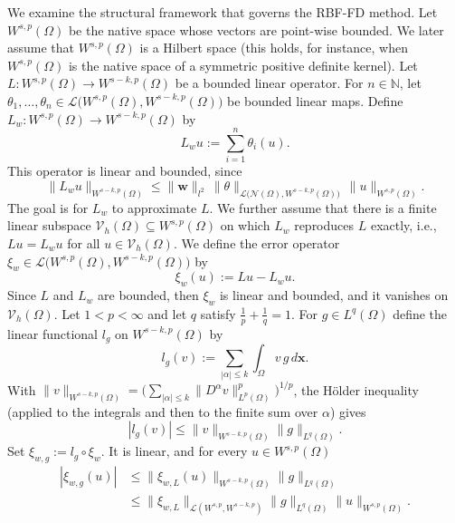 \documentclass[11pt]{article}
\begin{document}
We examine the structural framework that governs the RBF-FD method. Let $W^{s,p}(\Omega)$ be the native space whose vectors are point-wise bounded. We later assume that $W^{s,p}(\Omega)$ is a Hilbert space (this holds, for instance, when $W^{s,p}(\Omega)$ is the native space of a symmetric positive definite kernel). Let $L:W^{s,p}(\Omega) \rightarrow W^{s-k,p}(\Omega)$ be a bounded linear operator. For $n \in \mathbb{N}$, let $\theta_1, \dots, \theta_n \in \mathcal{L}\bigl(W^{s,p}(\Omega), W^{s-k,p}(\Omega)\bigr)$ be bounded linear maps. Define $L_w:W^{s,p}(\Omega) \rightarrow W^{s-k,p}(\Omega)$ by
\begin{equation}
	L_w u := \sum_{i=1}^n \theta_i(u).
\end{equation}
This operator is linear and bounded, since
\begin{equation*}
	\| L_w u \|_{W^{s-k,p}(\Omega)} \le \| \bm{w} \|_{l^2} \, \| \theta \|_{\mathcal{L}\bigl(\mathcal{N}(\Omega), W^{s-k,p}(\Omega)\bigr)} \, \| u \|_{W^{s,p}(\Omega)}.
\end{equation*}
The goal is for $L_w$ to approximate $L$. We further assume that there is a finite linear subspace $\mathcal{V}_h(\Omega) \subseteq W^{s,p}(\Omega)$ on which $L_w$ reproduces $L$ exactly, i.e., $Lu = L_w u$ for all $u \in \mathcal{V}_h(\Omega)$. We define the error operator $\xi_{w} \in \mathcal{L}\bigl(W^{s,p}(\Omega), W^{s-k,p}(\Omega)\bigr)$ by
\begin{equation*}
	\xi_{w}(u) := Lu - L_w u .
\end{equation*}
Since $L$ and $L_w$ are bounded, then $\xi_w$ is linear and bounded, and it vanishes on $\mathcal{V}_h(\Omega)$. Let $1 < p < \infty$ and let $q$ satisfy $\frac{1}{p} + \frac{1}{q} = 1$. For $g \in L^{q}(\Omega)$ define the linear functional $l_g$ on $W^{s-k,p}(\Omega)$ by
\begin{equation*}
	l_g(v) := \sum_{|\alpha| \le k} \int_\Omega v \, g \, d\bm{x}.
\end{equation*}
With $\| v \|_{W^{s-k,p}(\Omega)} = \bigl( \sum_{|\alpha| \le k} \| D^\alpha v \|_{L^p(\Omega)}^p \bigr)^{1/p}$, the H\"{o}lder inequality (applied to the integrals and then to the finite sum over $\alpha$) gives
\begin{equation*}
	|l_g(v)| \le \| v \|_{W^{s-k,p}(\Omega)} \| g \|_{L^{q}(\Omega)}.
\end{equation*}
Set $\xi_{w,g} := l_g \circ \xi_{w}$. It is linear, and for every $u \in W^{s,p}(\Omega)$
\begin{align*}
	|\xi_{w,g}(u)| &\le \| \xi_{w,L}(u) \|_{W^{s-k,p}(\Omega)} \| g \|_{L{^q}(\Omega)}\\
	&\le \| \xi_{w,L} \|_{\mathcal{L}(W^{s,p}, W^{s-k,p})} \| g \|_{L^{q}(\Omega)} \| u \|_{W^{s,p}(\Omega)}.
\end{align*}
\end{document}
